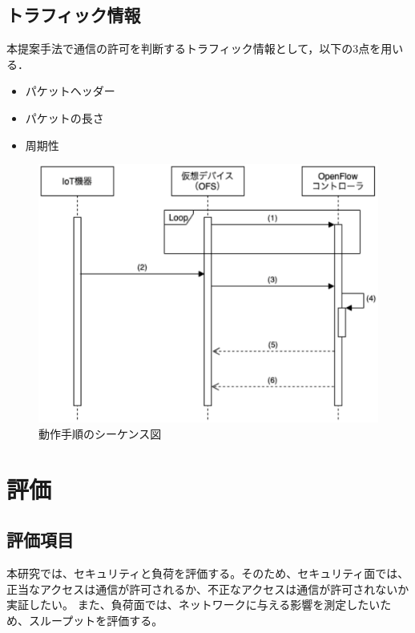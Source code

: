 \documentclass[a4paper,10pt,twocolumn,uplatex]{jsarticle}
\begin{document}
\subsection{トラフィック情報}
本提案手法で通信の許可を判断するトラフィック情報として，以下の3点を用いる．

\begin{itemize}
  \item パケットヘッダー
  \item パケットの長さ
  \item 周期性
\end{itemize}

\begin{figure}[!tb]
  \centering
  \includegraphics[width=\linewidth]{img/sequence.eps}
  \caption{動作手順のシーケンス図}
  \label{fig:sequence}
\end{figure}

\section{評価}

\subsection{評価項目}
本研究では、セキュリティと負荷を評価する。そのため、セキュリティ面では、正当なアクセスは通信が許可されるか、不正なアクセスは通信が許可されないか実証したい。
また、負荷面では、ネットワークに与える影響を測定したいため、スループットを評価する。
\end{document}
